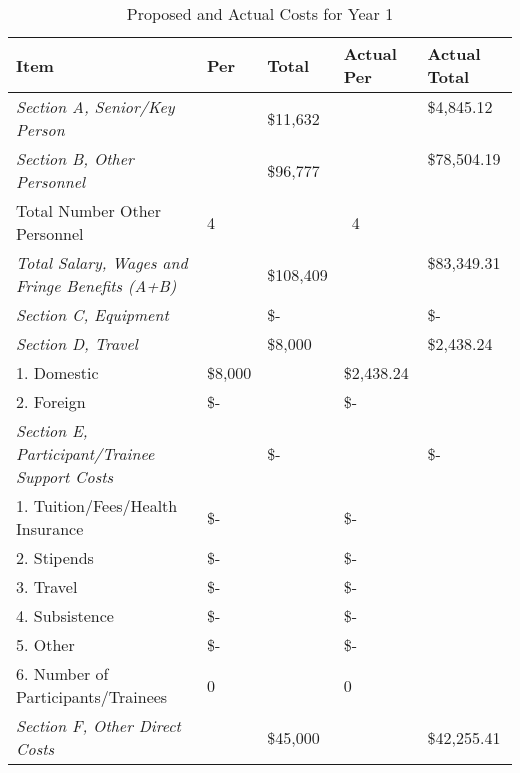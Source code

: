 \documentclass[12pt]{article}
\begin{document}
\begin{table}[h!]
\begin{center}
\caption{Proposed and Actual Costs for Year 1}
\begin{tabular}{ | l | l | l | l | l | }
\hline
	\textbf{Item} & \textbf{Per} & \textbf{Total} & \textbf{Actual Per} & \textbf{Actual Total }\\ \hline
	\textit{Section A, Senior/Key Person} & & \$11,632 & & \$4,845.12  \  \\ \hline
	\textit{Section B, Other Personnel} & &  \$96,777 & & \$78,504.19 \  \\ \hline
	\hspace*{1 em}Total Number Other Personnel & 4 & & \ 4 & \    \\ \hline
	\textit{Total Salary, Wages and Fringe Benefits (A+B)} & &  \$108,409 & & \$83,349.31 \  \\ \hline
	\textit{Section C, Equipment} &  &  \$-    & \ &  \$-     \\ \hline
	\textit{Section D, Travel} & &  \$8,000 & & \$2,438.24   \\ \hline
	\hspace*{1 em}1.  Domestic & \$8,000 & &  \$2,438.24 & \  \\ \hline
	\hspace*{1 em}2.  Foreign &  \$-  & \   &  \$-    & \   \\ \hline
	\textit{Section E, Participant/Trainee Support Costs} & \ &  \$-    & \  &  \$-       \\ \hline
	\hspace*{1 em}1.  Tuition/Fees/Health Insurance &   \$-  & \   &  \$-      \ & \\ \hline
	\hspace*{1 em}2.  Stipends &  \$-   & \ &  \$-    & \    \\ \hline
	\hspace*{1 em}3.  Travel &  \$-    & \ &  \$-    & \   \\ \hline
	\hspace*{1 em}4.  Subsistence &  \$-    & \ &  \$-     & \  \\ \hline
	\hspace*{1 em}5.  Other &  \$-    & \  &  \$-    & \  \\ \hline
	\hspace*{1 em}6.  Number of Participants/Trainees & 0 & \ & 0 & \   \\ \hline
	\textit{Section F, Other Direct Costs}& \ & \$45,000  & & \$42,255.41    \\ \hline

\end{tabular}
\end{center}
\end{table}
\end{document}

